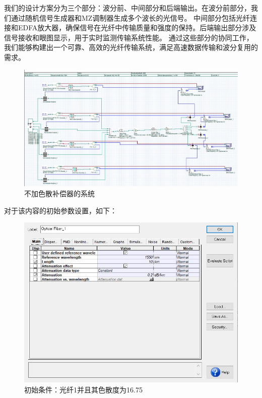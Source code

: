 \documentclass[12pt]{article}
\begin{document}
我们的设计方案分为三个部分：波分前、中间部分和后端输出。在波分前部分，我们通过随机信号生成器和MZ调制器生成多个波长的光信号。
中间部分包括光纤连接和EDFA放大器，确保信号在光纤中传输质量和强度的保持。后端输出部分涉及信号接收和眼图显示，用于实时监测传输系统性能。
通过这些部分的协同工作，我们能够构建出一个可靠、高效的光纤传输系统，满足高速数据传输和波分复用的需求。
\begin{figure}[H]
	\centering
	\includegraphics[width=13cm]{figure3.png}
  \caption{不加色散补偿器的系统}
\end{figure}
\clearpage
对于该内容的初始参数设置，如下：

\begin{figure}[H]
  \centering
  \includegraphics[width=13cm]{figure4.png}
  \caption{初始条件：光纤1并且其色散度为16.75}
\end{figure}
\end{document}
